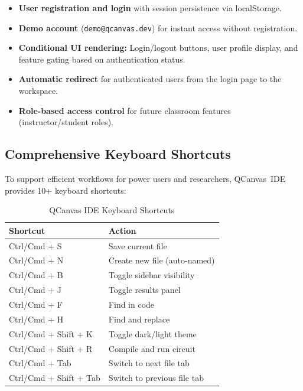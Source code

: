 \documentclass[conference]{IEEEtran}
\begin{document}
\begin{itemize}
    \item \textbf{User registration and login} with session persistence via localStorage.
    \item \textbf{Demo account} (\texttt{demo@qcanvas.dev}) for instant access without registration.
    \item \textbf{Conditional UI rendering:} Login/logout buttons, user profile display, and feature gating based on authentication status.
    \item \textbf{Automatic redirect} for authenticated users from the login page to the workspace.
    \item \textbf{Role-based access control} for future classroom features (instructor/student roles).
\end{itemize}

\subsection{Comprehensive Keyboard Shortcuts}

To support efficient workflows for power users and researchers, QCanvas~IDE provides 10+ keyboard shortcuts:

\begin{table}[t]
\centering
\caption{QCanvas IDE Keyboard Shortcuts}
\label{tab:shortcuts}
\begin{tabular}{@{}ll@{}}
\toprule
\textbf{Shortcut} & \textbf{Action} \\
\midrule
Ctrl/Cmd + S           & Save current file \\
Ctrl/Cmd + N           & Create new file (auto-named) \\
Ctrl/Cmd + B           & Toggle sidebar visibility \\
Ctrl/Cmd + J           & Toggle results panel \\
Ctrl/Cmd + F           & Find in code \\
Ctrl/Cmd + H           & Find and replace \\
Ctrl/Cmd + Shift + K   & Toggle dark/light theme \\
Ctrl/Cmd + Shift + R   & Compile and run circuit \\
Ctrl/Cmd + Tab         & Switch to next file tab \\
Ctrl/Cmd + Shift + Tab & Switch to previous file tab \\
\bottomrule
\end{tabular}
\end{table}
\end{document}

